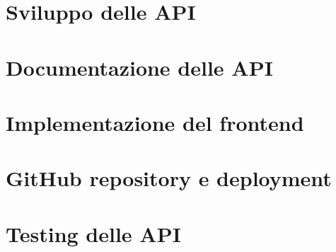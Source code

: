 \documentclass[a4paper,12pt]{article}
\begin{document}
\newpage
\section{Sviluppo delle API}

\newpage
\section{Documentazione delle API}

\newpage
\section{Implementazione del frontend}

\newpage
\section{GitHub repository e deployment}

\newpage
\section{Testing delle API}
\end{document}
